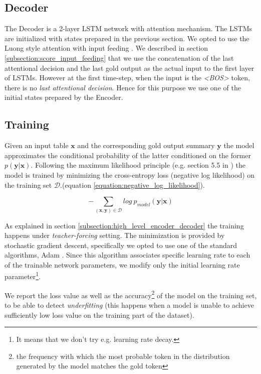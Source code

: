 \subsection{Decoder}

The Decoder is a 2-layer LSTM network with attention mechanism. The LSTMs are initialized with states prepared in the previous section. We opted to use the Luong style attention with input feeding \citep{luong2015effective}. We described in section \ref{subsection:score_input_feeding} that we use the concatenation of the last attentional decision and the last gold output as the actual input to the first layer of LSTMs. However at the first time-step, when the input is the \emph{\textless BOS\textgreater} token, there is no \emph{last attentional decision}. Hence for this purpose we use one of the initial states prepared by the Encoder.

\subsection{Training}

Given an input table $\boldsymbol{x}$ and the corresponding gold output summary $\boldsymbol{y}$ the model approximates the conditional probability of the latter conditioned on the former $p(\boldsymbol{y} | \boldsymbol{x})$. Following the maximum likelihood principle (e.g. section 5.5 in \citep{Goodfellow-et-al-2016}) the model is trained by minimizing the cross-entropy loss (negative log likelihood) on the training set $\mathcal{D}$.(equation \ref{equation:negative_log_likelihood}).

\begin{equation} \label{equation:negative_log_likelihood}
    - \sum_{(\boldsymbol{x}, \boldsymbol{y}) \in \mathcal{D}}{log\ p_{model}(\boldsymbol{y} | \boldsymbol{x})}
\end{equation}

As explained in section \ref{subsection:high_level_encoder_decoder} the training happens under \emph{teacher-forcing} setting. The minimization is provided by stochastic gradient descent, specifically we opted to use one of the standard algorithms, Adam \citep{kingma2014adam}. Since this algorithm associates specific learning rate to each of the trainable network parameters, we modify only the initial learning rate parameter\footnote{It means that we don't try e.g. learning rate decay.}.

We report the loss value as well as the accuracy\footnote{the frequency with which the most probable token in the distribution generated by the model matches the gold token} of the model on the training set, to be able to detect \emph{underfitting} (this happens when a model is unable to achieve sufficiently low loss value on the training part of the dataset).

